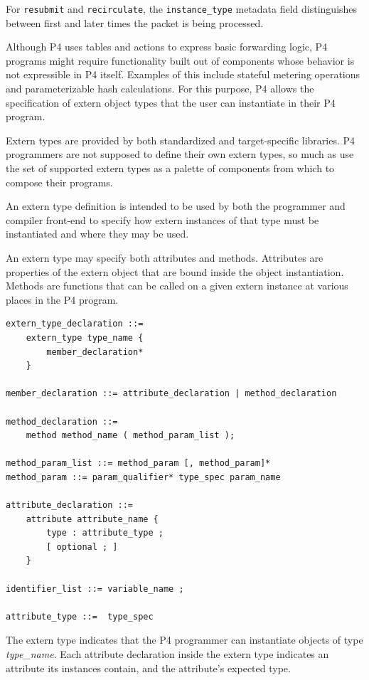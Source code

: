 \documentclass[12pt]{article}
\begin{document}
For \texttt{resubmit} and \texttt{recirculate}, the
\texttt{instance_type} metadata field distinguishes between first and
later times the packet is being processed.



Although P4 uses \matchaction tables and actions to express basic forwarding
logic, P4 programs might require functionality built out of components
whose behavior is not expressible in P4 itself. Examples of this include
stateful metering operations and parameterizable hash calculations. For this
purpose, P4 allows the specification of extern object types that the
user can instantiate in their P4 program.

Extern types are provided by both standardized and target-specific libraries.
P4 programmers are not supposed to define their own extern types, so much
as use the set of supported extern types as a palette of components from which
to compose their programs. 

 An extern type definition is intended to be 
used by both the programmer and compiler front-end to specify how extern
instances of that type must be instantiated and where they may be used.

An extern type may specify both attributes and methods. Attributes are
properties of the extern object that are bound inside the object
instantiation. Methods are functions that can be called on a given extern
instance at various places in the P4 program.

\begin{lstlisting}[style=BNFstyle]
extern_type_declaration ::= 
    extern_type type_name {
        member_declaration*
    }

member_declaration ::= attribute_declaration | method_declaration

method_declaration ::= 
    method method_name ( method_param_list );

method_param_list ::= method_param [, method_param]*
method_param ::= param_qualifier* type_spec param_name

attribute_declaration ::= 
    attribute attribute_name {
        type : attribute_type ;
        [ optional ; ]
    }

identifier_list ::= variable_name ;

attribute_type ::=  type_spec
\end{lstlisting}

The extern type indicates that the P4 programmer can instantiate objects of
type \textit{type_name}. Each attribute declaration inside the extern type 
indicates an attribute its instances contain, and the attribute's expected type.
\end{document}
